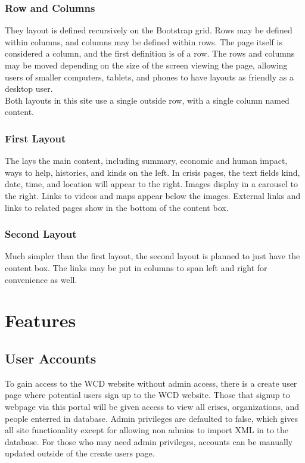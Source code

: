 \documentclass[12pt]{report}
\begin{document}
\subsubsection*{Row and Columns}
They layout is defined recursively on the Bootstrap grid.
Rows may be defined within columns, and columns may be defined within rows.
The page itself is considered a column, and the first definition is of a row.
The rows and columns may be moved depending on the size of the screen viewing the page,
allowing users of smaller computers, tablets, and phones to have layouts as friendly as
a desktop user.
\\

Both layouts in this site use a single outside row, with a single column named content.
\\


\subsubsection*{First Layout}
The lays the main content, including summary, economic and human impact,
ways to help, histories, and kinds on the left.
In crisis pages, the text fields kind, date, time, and location will appear to the right.
Images display in a carousel to the right.
Links to videos and maps appear below the images.
External links and links to related pages show in the bottom of the content box.
\\


\subsubsection*{Second Layout}
Much simpler than the first layout, the second layout is planned to just have the content box.
The links may be put in columns to span left and right for convenience as well.
\\


\newpage
\section*{Features}
\hfill


\subsection*{User Accounts}
\hfill

To gain access to the WCD website without admin access, there is a create user page where potential users sign up to the WCD website. Those that signup to webpage via this portal will be given access to view all crises, organizations, and people enterred in database. Admin privileges are defaulted to false, which gives all site functionality except for allowing non admins to import XML in to the database. For those who may need admin privileges, accounts can be manually updated outside of the create users page. 
\end{document}
